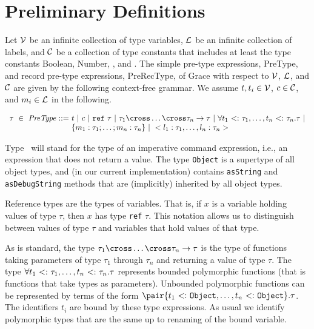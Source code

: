 \section{Preliminary Definitions}\label{sec::prelims}

\begin{definition} Let ${\cal V}$ be an infinite collection of type
variables, ${\cal L}$ be an infinite collection of labels, and
${\cal C}$ be a collection of type constants that includes at
least the type constants Boolean, Number, \Void, and
\Done.
The simple pre-type expressions, {PreType}, and record pre-type
expressions, {PreRecType}, of Grace with respect to ${\cal V}$,
${\cal L}$, and ${\cal C}$ are given by the following context-free
grammar.  We assume $t, t_{i} \in {\cal V}$, $c \in {\cal C}$, and $m_i \in
{\cal L}$ in the following.

$$\begin{array}{l@{}l@{}l} \tau\ \in\ \textit{PreType}\ &::=\ &t\ |\ c\
|\ \mbox{\tt ref}\ \tau\ |\ 
\tau_1 \cross \ldots \cross \tau_n \to \tau \ |\ 
\forall{ t_{1} \leS \tau_{1},\ldots,t_{n} \leS \tau_{n}}.\tau\ | \\&& 
\{m_1: \tau_1;\ldots; m_n: \tau_n\}\ |\ 
<l_1: \tau_1 , \ldots, l_n: \tau_n >
\end{array}$$

\end{definition}

Type \Void\ will stand for the type of an
imperative command expression, i.e., an expression that does not 
return a value.  The type
\texttt{Object} is a supertype of all object types, and (in our current
implementation) contains \texttt{asString} and \texttt{asDebugString}
methods that are (implicitly) inherited by all object types.

Reference types are the types of variables.  That is, if $x$ is a variable
holding values of type $\tau$, then $x$ has type \texttt{ref} $\tau$.
This notation allows us to distinguish between values of type $\tau$ and
variables that hold values of that type.

As is standard, the type $\tau_1 \cross \ldots \cross \tau_n \to \tau$
is the type of functions taking parameters of type $\tau_{1}$ through
$\tau_{n}$ and returning a value of type $\tau$.  The type $\forall{
t_{1} {\rm \ <: \ }\tau_{1},\ldots,t_{n} {\rm \ <: \ }\tau_{n}}.\tau$ represents bounded
polymorphic functions (that is functions that take types as
parameters).  Unbounded polymorphic functions can be represented by
terms of the form $\pair{ t_{1} \leS \texttt{Object},\ldots,t_{n} \leS
\texttt{Object}}.\tau$.  The identifiers $t_{i}$ are bound by these type
expressions.  As usual we identify polymorphic types that are the same
up to renaming of the bound variable.

